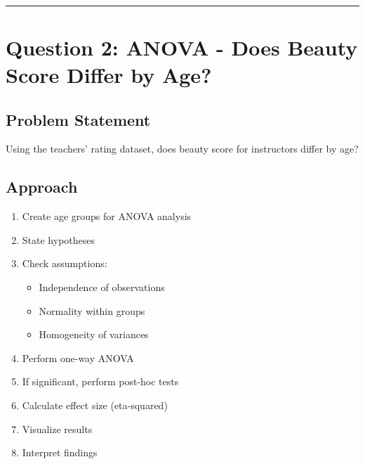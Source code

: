 \documentclass[11pt]{article}
\providecommand{\tightlist}{%
      \setlength{\itemsep}{0pt}\setlength{\parskip}{0pt}}
\begin{document}
    \begin{center}
    \end{center}
    { \hspace*{\fill} \\}
    
    \begin{center}\rule{0.5\linewidth}{0.5pt}\end{center}

\section{Question 2: ANOVA - Does Beauty Score Differ by
Age?}\label{question-2-anova---does-beauty-score-differ-by-age}

\subsection{Problem Statement}\label{problem-statement}

Using the teachers' rating dataset, does beauty score for instructors
differ by age?

\subsection{Approach}\label{approach}

\begin{enumerate}
\def\labelenumi{\arabic{enumi}.}
\tightlist
\item
  Create age groups for ANOVA analysis
\item
  State hypotheses
\item
  Check assumptions:

  \begin{itemize}
  \tightlist
  \item
    Independence of observations
  \item
    Normality within groups
  \item
    Homogeneity of variances
  \end{itemize}
\item
  Perform one-way ANOVA
\item
  If significant, perform post-hoc tests
\item
  Calculate effect size (eta-squared)
\item
  Visualize results
\item
  Interpret findings
\end{enumerate}
\end{document}
